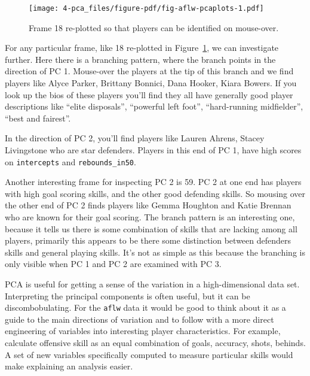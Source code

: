\documentclass[
  letterpaper,
]{krantz}
\begin{document}
\begin{figure}[H]

{\centering \texttt{[image: 4-pca\_files/figure-pdf/fig-aflw-pcaplots-1.pdf]}

}

\caption{\label{fig-aflw-pcaplots}Frame 18 re-plotted so that players
can be identified on mouse-over.}

\end{figure}

For any particular frame, like 18 re-plotted in
Figure~\ref{fig-aflw-pcaplots}, we can investigate further. Here there
is a branching pattern, where the branch points in the direction of PC
1. Mouse-over the players at the tip of this branch and we find players
like Alyce Parker, Brittany Bonnici, Dana Hooker, Kiara Bowers. If you
look up the bios of these players you'll find they all have generally
good player descriptions like ``elite disposals'', ``powerful left
foot'', ``hard-running midfielder'', ``best and fairest''.

In the direction of PC 2, you'll find players like Lauren Ahrens, Stacey
Livingstone who are star defenders. Players in this end of PC 1, have
high scores on \texttt{intercepts} and \texttt{rebounds\_in50}.

Another interesting frame for inspecting PC 2 is 59. PC 2 at one end has
players with high goal scoring skills, and the other good defending
skills. So mousing over the other end of PC 2 finds players like Gemma
Houghton and Katie Brennan who are known for their goal scoring. The
branch pattern is an interesting one, because it tells us there is some
combination of skills that are lacking among all players, primarily this
appears to be there some distinction between defenders skills and
general playing skills. It's not as simple as this because the branching
is only visible when PC 1 and PC 2 are examined with PC 3.

PCA is useful for getting a sense of the variation in a high-dimensional
data set. Interpreting the principal components is often useful, but it
can be discombobulating. For the \texttt{aflw} data it would be good to
think about it as a guide to the main directions of variation and to
follow with a more direct engineering of variables into interesting
player characteristics. For example, calculate offensive skill as an
equal combination of goals, accuracy, shots, behinds. A set of new
variables specifically computed to measure particular skills would make
explaining an analysis easier.
\end{document}
